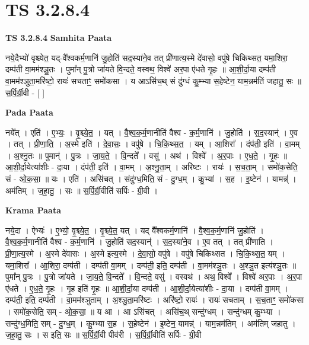 \documentclass[17pt]{extarticle}
\begin{document}

\section{ TS 3.2.8.4 }

\textbf{TS 3.2.8.4 } \newline
\textbf{Samhita Paata} \newline

नये॒दैभ्यो॑ वृश्च्येत॒ यद्-वै᳚श्वकर्म॒णानि॑ जु॒होति॑ सद॒स्या॑ने॒व तत् प्री॑णात्य॒स्मे दे॑वासो॒ वपु॑षे चिकिथ्सत॒ यमा॒शिरा॒ दम्प॑ती वा॒मम॑श्ञु॒तः । पुमा᳚न् पु॒त्रो जा॑यते वि॒न्दते॒ वस्वथ॒ विश्वे॑ अर॒पा ए॑धते गृ॒हः ॥ आ॒शी॒र्दा॒या दम्प॑ती वा॒मम॑श्ञुता॒मरि॑ष्टो॒ रायः॑ सचताꣳ॒॒ समो॑कसा । य आऽसि॑च॒थ् सं दु॑ग्धं कु॒म्भ्या स॒हेष्टेन॒ याम॒न्नम॑तिं जहातु॒ सः ॥ स॒र्पि॒र्ग्री॒वी - [  ] \newline

\textbf{Pada Paata} \newline

नये᳚त् । एति॑ । ए॒भ्यः॒ । वृ॒श्च्ये॒त॒ । यत् । वै॒श्व॒क॒र्म॒णानीति॑ वैश्व - क॒र्म॒णानि॑ । जु॒होति॑ । स॒द॒स्यान्॑ । ए॒व । तत् । प्री॒णा॒ति॒ । अ॒स्मे इति॑ । दे॒वा॒सः॒ । वपु॑षे । चि॒कि॒थ्स॒त॒ । यम् । आ॒शिरा᳚ । दंप॑ती॒ इति॑ । वा॒मम् । अ॒श्नु॒तः ॥ पुमान्॑ । पु॒त्रः । जा॒य॒ते॒ । वि॒न्दते᳚ । वसु॑ । अथ॑ । विश्वे᳚ । अ॒र॒पाः । ए॒ध॒ते॒ । गृ॒हः ॥ आ॒शी॒र्दा॒येत्या॑शीः - दा॒या । दंप॑ती॒ इति॑ । वा॒मम् । अ॒श्नु॒ता॒म् । अरि॑ष्टः । रायः॑ । स॒च॒ता॒म् । समो॑क॒सेति॒ सं - ओ॒क॒सा॒ ॥ यः । एति॑ । असि॑चत् । संदु॑ग्ध॒मिति॒ सं - दु॒ग्ध॒म् । कु॒भ्यां । स॒ह । इ॒ष्टेन॑ । यामन्न्॑ । अम॑तिम् । ज॒हा॒तु॒ । सः ॥ स॒र्पि॒र्ग्री॒वीति॑ सर्पिः - ग्री॒वी ।  \newline


\textbf{Krama Paata} \newline

नये॒दा । ऐभ्यः॑ । ए॒भ्यो॒ वृ॒श्च्ये॒त॒ । वृ॒श्च्ये॒त॒ यत् । यद् वै᳚श्वकर्म॒णानि॑ । वै॒श्व॒क॒र्म॒णानि॑ जु॒होति॑ । वै॒श्व॒क॒र्म॒णानीति॑ वैश्व - क॒र्म॒णानि॑ । जु॒होति॑ सद॒स्यान्॑ । स॒द॒स्या॑ने॒व । ए॒व तत् । तत् प्री॑णाति । प्री॒णा॒त्य॒स्मे । अ॒स्मे दे॑वासः । अ॒स्मे इत्य॒स्मे । दे॒वा॒सो॒ वपु॑षे । वपु॑षे चिकिथ्सत । चि॒कि॒थ्स॒त॒ यम् । यमा॒शिरा᳚ । आ॒शिरा॒ दम्प॑ती । दम्प॑ती वा॒मम् । दम्प॑ती॒ इति॒ दम्प॑ती । वा॒मम॑श्ञु॒तः । अ॒श्ञु॒त इत्य॑श्ञु॒तः ॥ पुमा᳚न् पु॒त्रः । पु॒त्रो जा॑यते । जा॒य॒ते॒ वि॒न्दते᳚ । वि॒न्दते॒ वसु॑ । वस्वथ॑ । अथ॒ विश्वे᳚ । विश्वे॑ अर॒पाः । अ॒र॒पा ए॑धते । ए॒ध॒ते॒ गृ॒हः । गृ॒ह इति॑ गृ॒हः ॥ आ॒शी॒र्दा॒या दम्प॑ती । आ॒शी॒र्दा॒येत्या॑शीः - दा॒या । दम्प॑ती वा॒मम् । दम्प॑ती॒ इति॒ दम्प॑ती । वा॒मम॑श्ञुताम् । अ॒श्ञु॒ता॒मरि॑ष्टः । अरि॑ष्टो॒ रायः॑ । रायः॑ सचताम् । स॒च॒ताꣳ॒॒ समो॑कसा । समो॑क॒सेति॒ सम् - ओ॒क॒सा॒ ॥ य आ । आ ऽसि॑चत् । असि॑च॒थ् सन्दु॑ग्धम् । सन्दु॑ग्धम् कु॒म्भ्या । सन्दु॑ग्ध॒मिति॒ सम् - दु॒ग्ध॒म् । कु॒म्भ्या स॒ह । स॒हेष्टेन॑ । इ॒ष्टेन॒ यामन्न्॑ । याम॒न्नम॑तिम् । अम॑तिम् जहातु । ज॒हा॒तु॒ सः । स इति॒ सः ॥ स॒र्पि॒र्ग्री॒वी पीव॑री । स॒र्पि॒र्ग्री॒वीति॑ सर्पिः - ग्री॒वी \newline
\end{document}

